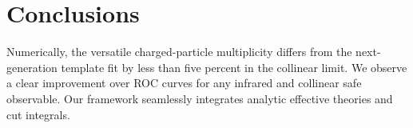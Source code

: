 \section{Conclusions}\label{sec:conclusions}

Numerically, the versatile charged-particle multiplicity differs from
the next-generation template fit by less than five percent in the
collinear limit. We observe a clear improvement over ROC curves for any
infrared and collinear safe observable. Our framework seamlessly
integrates analytic effective theories and cut integrals.

